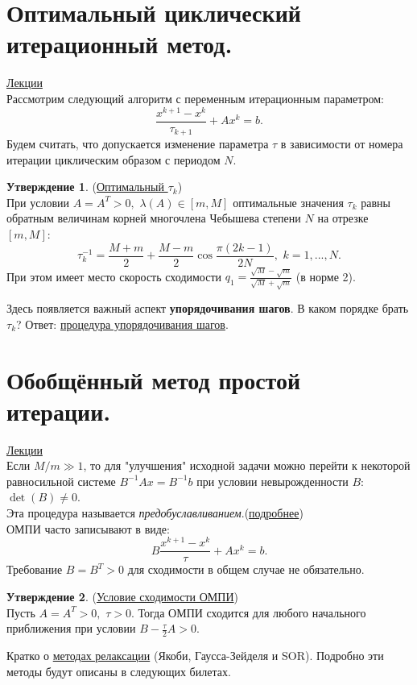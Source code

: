 \documentclass[specialist, subf, href, colorlinks=true, 12pt, times, mtpro, final]{disser}
\theoremstyle{definition}
\newtheorem{state}{Утверждение}[section]
\begin{document}
{\section {Оптимальный циклический итерационный метод.}
    \hyperlink {lects.61}{Лекции}\\
    Рассмотрим следующий алгоритм с переменным итерационным параметром:
    $$
        \frac{x^{k+1} - x^{k}}{\tau_{k+1}} + Ax^{k} = b.
    $$
    Будем считать, что допускается изменение параметра $\tau$ в зависимости от номера итерации циклическим образом с периодом $N$.
    \begin{state} (\hyperlink {lects.61}{Оптимальный $\tau_{k}$})\\
    При условии $A = A^T > 0, \,\, \lambda(A) \in [m, M]$ оптимальные значения $\tau_k$
    равны обратным величинам корней многочлена Чебышева степени $N$ на отрезке $[m, M]$:
    $$
    \tau_k^{-1} = \frac{M+m}{2} + \frac{M-m}{2}\cos\frac{\pi(2k-1)}{2N}, \,\, k = 1,...,N.
    $$
    При этом имеет место скорость сходимости
    $q_1 = \frac{\sqrt{M}-\sqrt{m}}{\sqrt{M}+\sqrt{m}}$ (в норме 2).
    \end{state}
    Здесь появляется важный аспект {\bf упорядочивания шагов}. В каком порядке брать $\tau_k$?
    Ответ: \hyperlink {lects.62}{процедура упорядочивания шагов}.

\section {Обобщённый метод простой итерации.}
    \hyperlink {lects.63}{Лекции}\\
    Если $M/m \gg 1$, то для "улучшения"{} исходной задачи можно перейти к некоторой равносильной системе $B^{-1}Ax = B^{-1}b$ при условии невырожденности $B$:
    $\det(B) \ne 0$.\\
    Эта процедура называется {\it предобуславливанием}.(\hyperlink {lects.63}{подробнее})\\
    ОМПИ часто записывают в виде:
    $$
        B\frac{x^{k+1} - x^{k}}{\tau} + Ax^{k} = b.
    $$
    Требование $B = B^T > 0$ для сходимости в общем случае не обязательно.
    \begin{state} (\hyperlink {lects.63}{Условие сходимости ОМПИ})\\
    Пусть $A = A^T > 0, \,\, \tau > 0$. Тогда ОМПИ сходится для любого начального
    приближения при условии $B - \frac{\tau}{2}A > 0$.
    \end{state}
    Кратко о \hyperlink {lects.64}{методах релаксации} (Якоби, Гаусса-Зейделя и SOR).
    Подробно эти методы будут описаны в следующих билетах.

}
\end{document}
